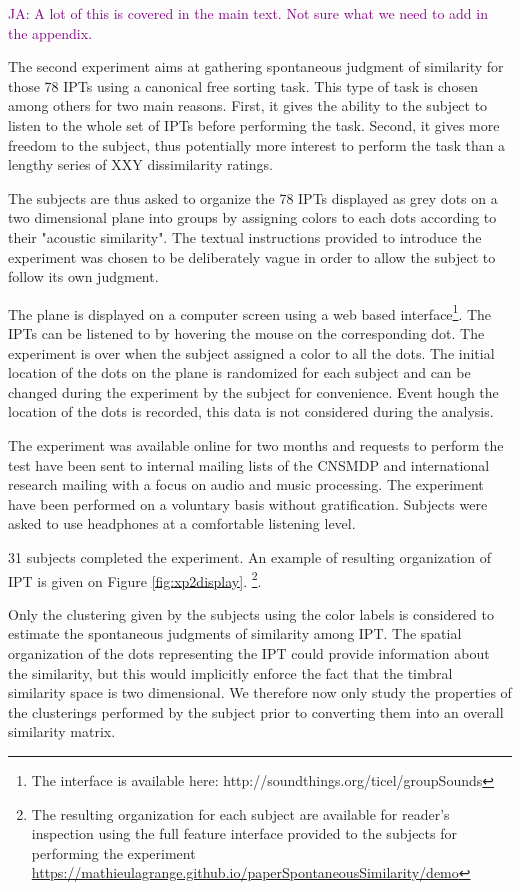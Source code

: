 \documentclass{bmcart}
\newcommand{\ipt}{IPT\xspace}
\newcommand{\ipts}{IPTs\xspace}
\newcommand{\ja}[1]{\textcolor{purple}{JA: #1}}
\begin{document}
\begin{backmatter}
\ja{A lot of this is covered in the main text.
Not sure what we need to add in the appendix.}

The second experiment aims at gathering spontaneous judgment of similarity for those 78 \ipts using a canonical free sorting task. This type of task is chosen among others for two main reasons. First, it gives the ability to the subject to listen to the whole set of \ipts before performing the task. Second, it gives more freedom to the subject, thus potentially more interest to perform the task than a lengthy series of XXY dissimilarity ratings.

The subjects are thus asked to organize the 78 \ipts displayed as grey dots on a two dimensional plane into groups by assigning colors to each dots according to their "acoustic similarity". The textual instructions provided to introduce the experiment was chosen to be deliberately vague in order to allow the subject to follow its own judgment.

The plane is displayed on a computer screen using a web based interface\footnote{The interface is available here: http://soundthings.org/ticel/groupSounds}. The \ipts can be listened to by hovering the mouse on the corresponding dot. The experiment is over when the subject assigned a color to all the dots. The initial location of the dots on the plane is randomized for each subject and can be changed during the experiment by the subject for convenience. Event hough the location of the dots is recorded, this data is not considered during the analysis.

The experiment was available online for two months and requests to perform the test have been sent to internal mailing lists of the CNSMDP and international research mailing with a focus on audio and music processing. The experiment have been performed on a voluntary basis without gratification. Subjects were asked to use headphones at a comfortable listening level.


31 subjects completed the experiment. An example of resulting organization of \ipt is given on Figure \ref{fig:xp2display}. \footnote{The resulting organization for each subject are available for reader's inspection using the full feature interface provided to the subjects for performing the experiment \url{https://mathieulagrange.github.io/paperSpontaneousSimilarity/demo}}.

Only the clustering given by the subjects using the color labels is considered to estimate the spontaneous judgments of similarity among \ipt. The spatial organization of the dots representing the \ipt could provide information about the similarity, but this would implicitly enforce the fact that the timbral similarity space is two dimensional. We therefore now only study the properties of the clusterings performed by the subject prior to converting them into an overall similarity matrix.


\end{backmatter}
\end{document}

